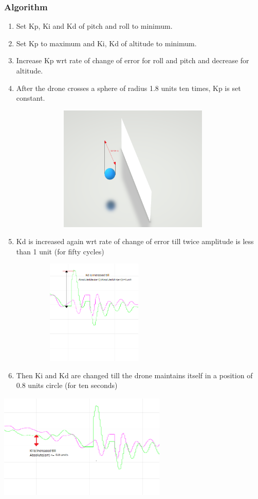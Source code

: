 \documentclass[a4paper,12pt,oneside]{book}
\begin{document}
\subsubsection{Algorithm}
\begin{enumerate}
     
\item Set Kp, Ki and Kd of pitch and roll to minimum. 
\item Set Kp to maximum and Ki, Kd of altitude to minimum.
\item Increase Kp wrt rate of change of error for roll and pitch and decrease for altitude.
\item After the drone crosses a sphere of radius 1.8 units ten times, Kp is set constant.

\includegraphics[width = 12cm , height= 6cm]{Capture.png}


\item Kd is increased again wrt rate of change of error till twice amplitude is less than 1 unit (for fifty cycles)

\includegraphics[width = 8cm , height= 5cm]{Autotune_iteration_1_e1.png}


\item Then Ki and Kd are changed till the drone maintains itself in a position of 0.8 units circle (for ten seconds)
\end{enumerate}


\includegraphics[width = 8cm , height= 5cm]{Autotune_iteration_1_e2.png}
\end{document}

